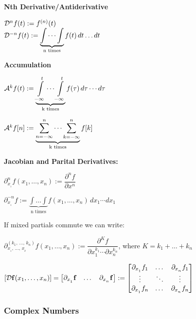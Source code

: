 \documentclass[11pt]{article}
\begin{document}
  \begin{multicols}{2}
  \textbf{Nth Derivative/Antiderivative}

  \(\mathcal{D}^nf(t) := f^{(n)}(t)\) \\

  \(\mathcal{D}^{-n}f(t) := \underbrace{\displaystyle
  \int \cdots \int}_{\textrm{n times}}{f(t)\,dt \dots dt}\)

  \columnbreak

  \textbf{Accumulation}

  \(\mathcal{A}^{k}f(t) := \underbrace{\displaystyle{\int\limits_{-\infty}^{t}} \textstyle \cdots \displaystyle{\int\limits_{-\infty}^{t}} \textstyle}_{\textrm{k times}}{f(\tau)\,d\tau \cdots d\tau}\)

  \(\mathcal{A}^{k}f[n] := \displaystyle
  \underbrace{\sum_{n = -\infty}^n \dots \sum_{k = -\infty}^n}_{\textrm{k times}}f[k]\)

  \end{multicols}

  \textbf{Jacobian and Parital Derivatives:}

  \(\partial^n_{x_{_1}}f(x_1, \dots, x_n) := \dfrac{\partial^n f}{\partial x^n}\)

  \vspace{12pt}

  \(\partial^{-n}_{x_{_1}}f := \underbrace{\int \dots \int}_{\textrm{n times}}{f(x_1, \dots, x_n)\,dx_1 \cdots dx_1}\)

  \vspace{12pt}

  If mixed partials commute we can write:

  \(\partial^{(k_1,\, \dots,\, k_n)}_{x_{_1},\, \dots,\, x_{_k}}f(x_1, \dots, x_n) :=
  \dfrac{\partial^K f}{\partial x_1^{k_1} \cdots \partial x_n^{k_n}}\), where \(K = k_1 + \dots + k_n\)


  \({\left[ \mathcal{D} \mathbf{f}(x_1, \dots, x_n) \right]} =
  \begin{bmatrix}
    \partial_{x_{_1}} \mathbf{f} & \dots & \partial_{x_{_n}} \mathbf{f}
  \end{bmatrix} :=
  \begin{bmatrix}
    \partial_{x_{_1}} f_1 & \dots & \partial_{x_{_n}} f_1 \\
    \vdots & \ddots & \vdots \\
    \partial_{x_{_1}} f_n & \dots &  \partial_{x_{_n}} f_n
  \end{bmatrix}\)

  \subsubsection{Complex Numbers}
\end{document}
